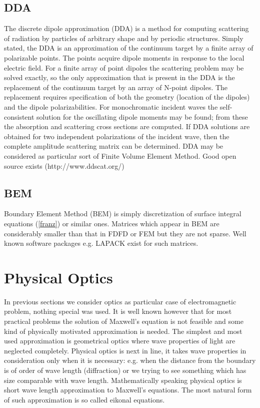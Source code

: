 \documentclass[12pt]{article}
\begin{document}
\subsection{DDA}
The discrete dipole approximation (DDA) is a method for computing scattering of radiation by particles of arbitrary shape and by periodic structures. Simply stated, the DDA is an approximation of the continuum target by a finite array of polarizable points. The points acquire dipole moments in response to the local electric field. For a finite array of point dipoles the scattering problem may be solved exactly, so the only approximation that is present in the DDA is the replacement of the continuum target by an array of N-point dipoles. The replacement requires specification of both the geometry (location of the dipoles) and the dipole polarizabilities. For monochromatic incident waves the self-consistent solution for the oscillating dipole moments may be found; from these the absorption and scattering cross sections are computed. If DDA solutions are obtained for two independent polarizations of the incident wave, then the complete amplitude scattering matrix can be determined. DDA may be considered as particular sort of Finite Volume Element Method. Good open source exists (http://www.ddscat.org/)
\subsection{BEM}
Boundary Element Method (BEM) is simply  discretization of surface integral equations (\ref{franz}) or similar ones. Matrices which appear in BEM are considerably smaller than that in FDFD or FEM but they are not sparse. Well known software packages e.g. LAPACK exist for such matrices.
\section{Physical Optics}
In previous sections we consider optics as particular case of electromagnetic problem, nothing special was used. It is well known however that for most practical problems the solution of Maxwell's equation is not feasible and some kind of physically motivated approximation is needed. The simplest and most used approximation is geometrical optics where wave properties of light are neglected completely. Physical optics is next in line, it takes wave properties in consideration only when it is necessary: e.g. when the distance from the boundary is of order of wave length (diffraction) or we trying to see something which has size comparable with wave length. Mathematically speaking physical optics is short wave length approximation to Maxwell's equations. The most natural form of such approximation is so called eikonal equations.
\end{document}
